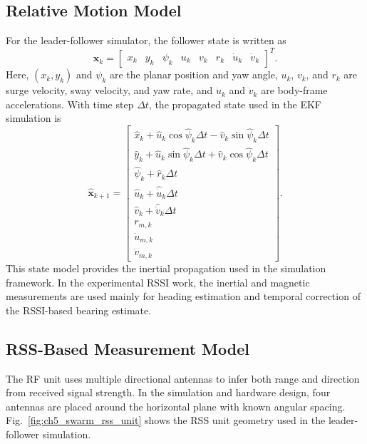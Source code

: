 \documentclass{uhcoethesis}
\begin{document}
\subsection{Relative Motion Model}

For the leader-follower simulator, the follower state is written as
\begin{equation}
    \mathbf{x}_k =
    \begin{bmatrix}
        x_k & y_k & \psi_k & u_k & v_k & r_k & \dot{u}_k & \dot{v}_k
    \end{bmatrix}^{T}.
    \label{eq:ch5_sim_state}
\end{equation}
Here, $(x_k,y_k)$ and $\psi_k$ are the planar position and yaw angle, $u_k$, $v_k$, and $r_k$ are surge velocity, sway velocity, and yaw rate, and $\dot{u}_k$ and $\dot{v}_k$ are body-frame accelerations. With time step $\Delta t$, the propagated state used in the EKF simulation is
\begin{equation}
    \hat{\mathbf{x}}_{k+1} =
    \begin{bmatrix}
    \hat{x}_k + \hat{u}_k \cos\hat{\psi}_k \Delta t - \hat{v}_k \sin\hat{\psi}_k \Delta t \\
    \hat{y}_k + \hat{u}_k \sin\hat{\psi}_k \Delta t + \hat{v}_k \cos\hat{\psi}_k \Delta t \\
    \hat{\psi}_k + \hat{r}_k \Delta t \\
    \hat{u}_k + \hat{\dot{u}}_k \Delta t \\
    \hat{v}_k + \hat{\dot{v}}_k \Delta t \\
    r_{m,k} \\
    \dot{u}_{m,k} \\
    \dot{v}_{m,k}
    \end{bmatrix}.
    \label{eq:ch5_motion_model}
\end{equation}
This state model provides the inertial propagation used in the simulation framework. In the experimental RSSI work, the inertial and magnetic measurements are used mainly for heading estimation and temporal correction of the RSSI-based bearing estimate.

\subsection{RSS-Based Measurement Model}

The RF unit uses multiple directional antennas to infer both range and direction from received signal strength. In the simulation and hardware design, four antennas are placed around the horizontal plane with known angular spacing. Fig.~\ref{fig:ch5_swarm_rss_unit} shows the RSS unit geometry used in the leader-follower simulation.
\end{document}
